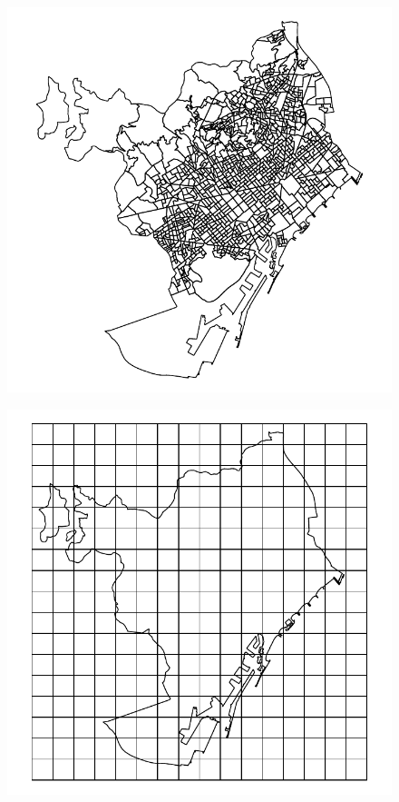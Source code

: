 \begin{figure}[ht!]
  \centering
  \begin{minipage}[b]{0.24\linewidth}
    \includegraphics[width=\linewidth]{images/Fig9a}
    \subcaption{}
    \label{fig:Fig9a}
  \end{minipage}
  \begin{minipage}[b]{0.24\linewidth}
    \includegraphics[width=\linewidth]{images/Fig9b}

\end{minipage}
\end{figure}
